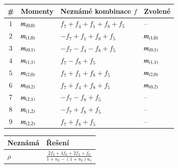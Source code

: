 \begin{table}[!h]
	\centering
	\begin{tabular}{c l l l}
		\toprule
		\# & Momenty & Neznámé kombinace $f$ & Zvolené\\
		\midrule
		\multirow{ 1}{*}{$1$} & \multirow{ 1}{*}{$m_{\left(0,0\right)}$} & $f_7+f_4+f_1+f_8+f_5$ & \multirow{ 1}{*}{--}\\ 
		\midrule
		\multirow{ 1}{*}{$2$} & \multirow{ 1}{*}{$m_{\left(1,0\right)}$} & $-f_7+f_1+f_8+f_5$ & \multirow{ 1}{*}{$m_{\left(1,0\right)}$}\\ 
		\midrule
		\multirow{ 1}{*}{$3$} & \multirow{ 1}{*}{$m_{\left(0,1\right)}$} & $-f_7-f_4-f_8+f_5$ & \multirow{ 1}{*}{$m_{\left(0,1\right)}$}\\ 
		\midrule
		\multirow{ 1}{*}{$4$} & \multirow{ 1}{*}{$m_{\left(1,1\right)}$} & $f_7-f_8+f_5$ & \multirow{ 1}{*}{$m_{\left(1,1\right)}$}\\ 
		\midrule
		\multirow{ 1}{*}{$5$} & \multirow{ 1}{*}{$m_{\left(2,0\right)}$} & $f_7+f_1+f_8+f_5$ & \multirow{ 1}{*}{$m_{\left(2,0\right)}$}\\ 
		\midrule
		\multirow{ 1}{*}{$6$} & \multirow{ 1}{*}{$m_{\left(0,2\right)}$} & $f_7+f_4+f_8+f_5$ & \multirow{ 1}{*}{$m_{\left(0,2\right)}$}\\ 
		\midrule
		\multirow{ 1}{*}{$7$} & \multirow{ 1}{*}{$m_{\left(2,1\right)}$} & $-f_7-f_8+f_5$ & \multirow{ 1}{*}{--}\\ 
		\midrule
		\multirow{ 1}{*}{$8$} & \multirow{ 1}{*}{$m_{\left(1,2\right)}$} & $-f_7+f_8+f_5$ & \multirow{ 1}{*}{--}\\ 
		\midrule
		\multirow{ 1}{*}{$9$} & \multirow{ 1}{*}{$m_{\left(2,2\right)}$} & $f_7+f_8+f_5$ & \multirow{ 1}{*}{--}\\ 
		\bottomrule
\end{tabular}\end{table}

\begin{table}[!h]
	\centering
	\begin{tabular}{l l}
		\toprule
		Neznámá & Řešení\\
		\midrule
		$\rho$ & $\frac{2 f_2+4 f_6+2 f_3+f_0}{1+u_2- {(1+u_2)} u_1}$ \\ 
		\bottomrule
\end{tabular}\end{table}

